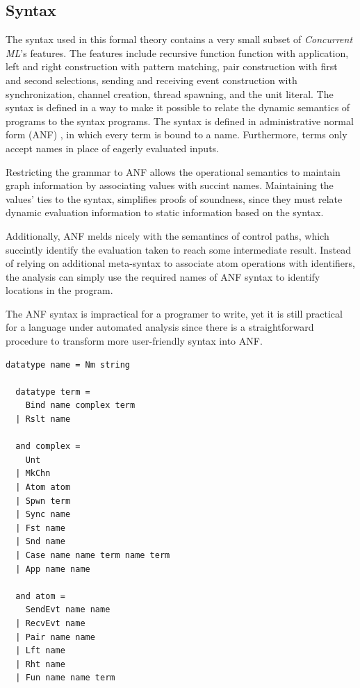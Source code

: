 \documentclass[letterpaper, 11pt]{extarticle}
\begin{document}
\subsection{Syntax}
The syntax used in this formal theory contains a very small subset of
\textit{Concurrent ML}'s features. The features include recursive function function with
application, left and right construction with pattern matching, pair construction with first
and second selections, sending and receiving event construction with synchronization,
channel creation, thread spawning, and the unit literal. The syntax is defined in a way to
make it possible to relate the dynamic semantics of programs to the syntax programs.
The syntax is defined in administrative normal form (ANF) \cite{flanagan1993essence}, in which every term
is bound to a name. Furthermore, terms only accept names in place of eagerly evaluated
inputs. 

Restricting the grammar to ANF allows the operational semantics
to maintain graph information by associating values with succint names.
Maintaining the values' ties to the syntax,
simplifies proofs of soundness, since they must relate dynamic evaluation information
to static information based on the syntax.

Additionally, ANF melds nicely with the semantincs of control paths, which succintly identify
the evaluation taken to reach some intermediate result.
Instead of relying on additional meta-syntax to associate atom operations with identifiers,
the analysis can simply use the required names of ANF syntax to identify locations in the program.

The ANF syntax is impractical for a programer to write,
yet it is still practical for a language under automated analysis
since there is a straightforward procedure to transform
more user-friendly syntax into ANF.

\begin{lstlisting}[language=logic]
  datatype name = Nm string

  datatype term = 
    Bind name complex term 
  | Rslt name

  and complex = 
    Unt
  | MkChn
  | Atom atom
  | Spwn term 
  | Sync name
  | Fst name
  | Snd name
  | Case name name term name term 
  | App name name

  and atom = 
    SendEvt name name
  | RecvEvt name
  | Pair name name
  | Lft name
  | Rht name
  | Fun name name term 
\end{lstlisting}
\end{document}
